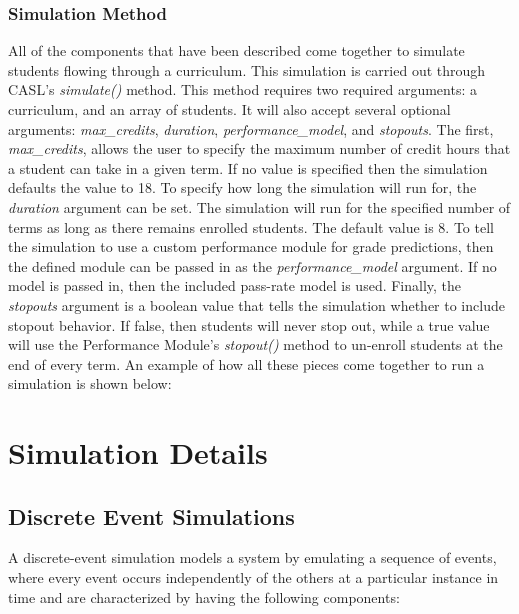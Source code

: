 \documentclass[botnum, fleqn]{unmeethesis}
\begin{document}
    \subsection{Simulation Method}
      All of the components that have been described come together to simulate students flowing through a curriculum. This simulation is carried out through CASL's \textit{simulate()} method. This method requires two required arguments: a curriculum, and an array of students. It will also accept several optional arguments: \textit{max\_credits}, \textit{duration}, \textit{performance\_model}, and \textit{stopouts}. The first, \textit{max\_credits}, allows the user to specify the maximum number of credit hours that a student can take in a given term. If no value is specified then the simulation defaults the value to 18. To specify how long the simulation will run for, the \textit{duration} argument can be set. The simulation will run for the specified number of terms as long as there remains enrolled students. The default value is 8. To tell the simulation to use a custom performance module for grade predictions, then the defined module can be passed in as the \textit{performance\_model} argument. If no model is passed in, then the included pass-rate model is used. Finally, the \textit{stopouts} argument is a boolean value that tells the simulation whether to include stopout behavior. If false, then students will never stop out, while a true value will use the Performance Module's \textit{stopout()} method to un-enroll students at the end of every term. An example of how all these pieces come together to run a simulation is shown below:

      


\chapter{Simulation Details}

  \section{Discrete Event Simulations}
    A discrete-event simulation models a system by emulating a sequence of events, where every event occurs independently of the others at a particular instance in time and are characterized by having the following components:
\end{document}
